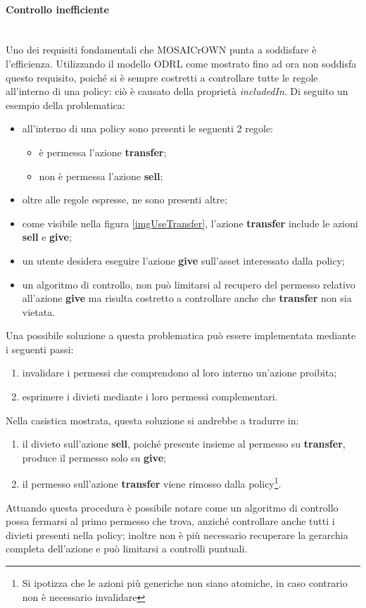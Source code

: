\documentclass[12pt,a4paper,twoside]{book}
\begin{document}
\paragraph{Controllo inefficiente}\mbox{}\\
Uno dei requisiti fondamentali che MOSAICrOWN punta a soddisfare è l'efficienza. Utilizzando il modello ODRL come mostrato fino ad ora non soddisfa questo requisito, poiché si è sempre costretti a controllare tutte le regole all'interno di una policy: ciò è causato della proprietà \textit{includedIn}. Di seguito un esempio della problematica:
\begin{itemize}
\item all'interno di una policy sono presenti le seguenti 2 regole:
\begin{itemize}
\item è permessa l'azione \textbf{transfer};
\item non è permessa l'azione \textbf{sell};
\end{itemize}
\item oltre alle regole espresse, ne sono presenti altre;
\item come visibile nella figura \ref{imgUseTransfer}, l'azione \textbf{transfer} include le azioni \textbf{sell} e \textbf{give}; 
\item un utente desidera eseguire l'azione \textbf{give} sull'asset interessato dalla policy;
\item un algoritmo di controllo, non può limitarsi al recupero del permesso relativo all'azione \textbf{give} ma risulta costretto a controllare anche che \textbf{transfer} non sia vietata.
\end{itemize}
Una possibile soluzione a questa problematica può essere implementata mediante i seguenti passi:
\begin{enumerate}
\item invalidare i permessi che comprendono al loro interno un'azione proibita;
\item esprimere i divieti mediante i loro permessi complementari.
\end{enumerate}
Nella casistica mostrata, questa soluzione si andrebbe a tradurre in:
\begin{enumerate}
\item il divieto sull'azione \textbf{sell}, poiché presente insieme al permesso su \textbf{transfer}, produce il permesso solo su \textbf{give};
\item il permesso sull'azione \textbf{transfer} viene rimosso dalla policy\footnote{Si ipotizza che le azioni più generiche non siano atomiche, in caso contrario non è necessario invalidare}.
\end{enumerate}
Attuando questa procedura è possibile notare come un algoritmo di controllo possa fermarsi al primo permesso che trova, anziché controllare anche tutti i divieti presenti nella policy; inoltre non è più necessario recuperare la gerarchia completa dell'azione e può limitarsi a controlli puntuali.
\end{document}
